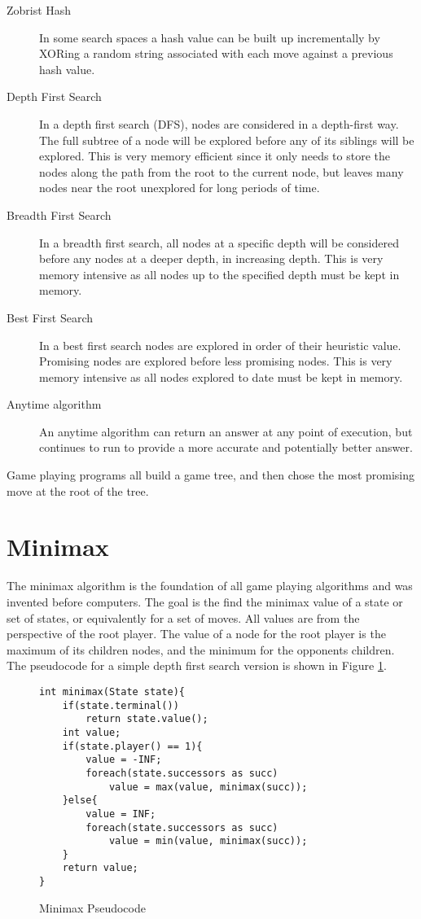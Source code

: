 \begin{description}
\item[Zobrist Hash] In some search spaces a hash value can be built up incrementally by XORing a random string associated with each move against a previous hash value.
\item[Depth First Search] In a depth first search (DFS), nodes are considered in a depth-first way. The full subtree of a node will be explored before any of its siblings will be explored. This is very memory efficient since it only needs to store the nodes along the path from the root to the current node, but leaves many nodes near the root unexplored for long periods of time.
\item[Breadth First Search] In a breadth first search, all nodes at a specific depth will be considered before any nodes at a deeper depth, in increasing depth. This is very memory intensive as all nodes up to the specified depth must be kept in memory.
\item[Best First Search] In a best first search nodes are explored in order of their heuristic value. Promising nodes are explored before less promising nodes. This is very memory intensive as all nodes explored to date must be kept in memory.
\item[Anytime algorithm] An anytime algorithm can return an answer at any point of execution, but continues to run to provide a more accurate and potentially better answer.
\end{description}

Game playing programs all build a game tree, and then chose the most promising move at the root of the tree.

\section{Minimax}

The minimax algorithm is the foundation of all game playing algorithms and was invented before computers. The goal is the find the minimax value of a state or set of states, or equivalently for a set of moves. All values are from the perspective of the root player. The value of a node for the root player is the maximum of its children nodes, and the minimum for the opponents children. The pseudocode for a simple depth first search version is shown in Figure \ref{fig:minimaxcode}.

\begin{figure}

\begin{lstlisting}
int minimax(State state){
	if(state.terminal())
		return state.value();
	int value;
	if(state.player() == 1){
		value = -INF;
		foreach(state.successors as succ)
			value = max(value, minimax(succ));
	}else{
		value = INF;
		foreach(state.successors as succ)
			value = min(value, minimax(succ));
	}
	return value;
}
\end{lstlisting}

\caption{Minimax Pseudocode}
\label{fig:minimaxcode}

\end{figure}


